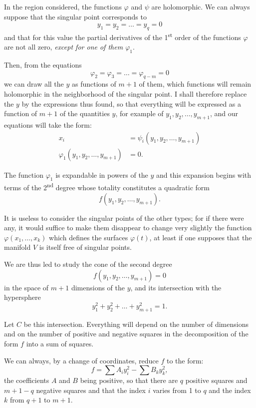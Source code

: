 \documentclass{article}
\begin{document}
In the region considered, the functions $\varphi$ and $\psi$ are holomorphic. We can always suppose that the singular point corresponds to
\[ y_{1} = y_{2} = \ldots = y_{q} = 0 \]
and that for this value the partial derivatives of the 1\textsuperscript{st} order of the functions $\varphi$ are not all zero, \emph{except for one of them $\varphi_{1}$}.

Then, from the equations
\[ \varphi_{2} = \varphi_{3} = \ldots = \varphi_{q-m} = 0 \]
we can draw all the $y$ as functions of $m + 1$ of them, which functions will remain holomorphic in the neighborhood of the singular point. I shall therefore replace the $y$ by the expressions thus found, so that everything will be expressed as a function of $m + 1$ of the quantities $y$, for example of $y_{1}, y_{2}, \ldots, y_{m+1}$, and our equations will take the form:
\[ \begin{aligned} x_{i} &= \psi_{i}(y_{1}, y_{2}, \ldots, y_{m+1})\\ \varphi_{1}(y_{1}, y_{2}, \ldots, y_{m+1}) &= 0. \end{aligned} \]

The function $\varphi_{1}$ is expandable in powers of the $y$ and this expansion begins with terms of the 2\textsuperscript{nd} degree whose totality constitutes a quadratic form
\[ f(y_{1}, y_{2}, \ldots, y_{m+1}). \]

It is useless to consider the singular points of the other types; for if there were any, it would suffice to make them disappear to change very slightly the function $\varphi(x_{1}, \ldots, x_{k})$ which defines the surfaces $\varphi(t)$, at least if one supposes that the manifold $V$ is itself free of singular points.

We are thus led to study the cone of the second degree
\[ f(y_{1}, y_{2}, \ldots, y_{m+1}) = 0 \]
in the space of $m + 1$ dimensions of the $y$, and its intersection with the hypersphere
\[ y^{2}_{1} + y^{2}_{2} + \ldots + y^{2}_{m+1} = 1. \]

Let $C$ be this intersection. Everything will depend on the number of dimensions and on the number of positive and negative squares in the decomposition of the form $f$ into a sum of squares.

We can always, by a change of coordinates, reduce $f$ to the form:
\[ f = \sum A_{i} y^{2}_{i} - \sum B_{k} y^{2}_{k}, \]
the coefficients $A$ and $B$ being positive, so that there are $q$ positive squares and $m + 1 - q$ negative squares and that the index $i$ varies from 1 to $q$ and the index $k$ from $q + 1$ to $m + 1$.
\end{document}

